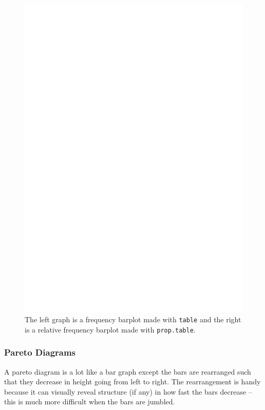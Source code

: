 \documentclass[captions=tableheading]{scrbook}
\begin{document}
\begin{example}
\begin{figure}[th]
  \includegraphics[angle=270, totalheight=4in]{ps/bar-gr-stateregion.ps}
  \caption[Bar graphs of the \texttt{state.region} data]{\small The left graph is a frequency barplot made with \texttt{table} and the right is a relative frequency barplot made with \texttt{prop.table}.}
  \label{fig:bar-gr-stateregion}
\end{figure}


\end{example}
\subsubsection{Pareto Diagrams}
\label{sec-2-1-4-3}
\label{par:Pareto-Diagrams}


A pareto diagram is a lot like a bar graph except the bars are rearranged such that they decrease in height going from left to right. The rearrangement is handy because it can visually reveal structure (if any) in how fast the bars decrease -- this is much more difficult when the bars are jumbled. 
\end{document}
